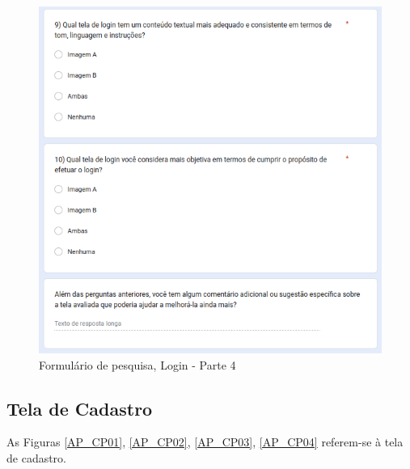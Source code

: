 \begin{figure}[!h]
	\begin{center}
	    \includegraphics[scale=0.6]{figs/Form/08.png}
	\end{center}
	\caption{\label{AP_LP04}Formulário de pesquisa, Login - Parte 4}
\end{figure}

\newpage

\subsection{Tela de Cadastro}

As Figuras \ref{AP_CP01}, \ref{AP_CP02}, \ref{AP_CP03}, \ref{AP_CP04} referem-se à tela de cadastro.

